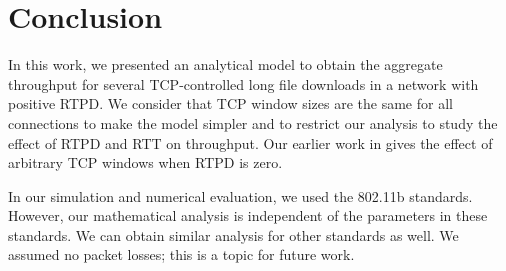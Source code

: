 \documentclass[conference]{IEEEtran}
\begin{document}
\section{Conclusion}\label{sec:Conclusion}
In this work, we presented an analytical model to obtain the aggregate
throughput for several TCP-controlled long file downloads in a network with
positive RTPD. We consider that TCP window sizes are the same for all 
connections to make the model simpler and to restrict our analysis to 
study the effect of RTPD and RTT on throughput. Our earlier work in 
\cite{astn_model:pradeep_kuri2} gives the effect of arbitrary TCP windows 
when RTPD is zero.

  In our simulation and numerical evaluation, we used the 802.11b standards.
However, our mathematical analysis is independent of  the parameters in these
standards. We can obtain similar analysis for other standards as well. We
assumed no packet losses; this is a topic for future work.  
\end{document}
